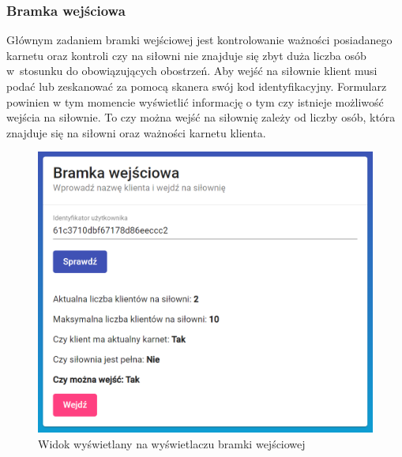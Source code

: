 \documentclass[a4paper,twoside,12pt]{book}
\begin{document}
\subsubsection{Bramka wejściowa}
Głównym zadaniem bramki wejściowej jest kontrolowanie ważności posiadanego karnetu oraz kontroli czy na siłowni nie znajduje się zbyt duża liczba osób w~stosunku do obowiązujących obostrzeń. Aby wejść na siłownie klient musi podać lub zeskanować za pomocą skanera swój kod identyfikacyjny. Formularz powinien w tym momencie wyświetlić informację o tym czy istnieje możliwość wejścia na siłownie. To czy można wejść na siłownię zależy od liczby osób, która znajduje się na siłowni oraz ważności karnetu klienta.
\begin{figure}[h!]
	\centering
	\includegraphics[width=0.8\linewidth]{../zrzuty_ekranu/dzialanie/bramki/bramka_wejsciowa}
	\caption{Widok wyświetlany na wyświetlaczu bramki wejściowej}
	\label{fig:bramkawejsciowa}
\end{figure}
\FloatBarrier
\end{document}
